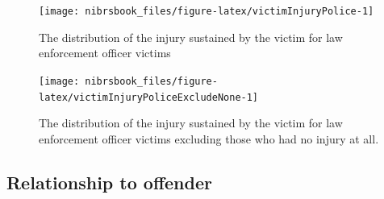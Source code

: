 \documentclass[
  12pt,
  openany]{book}
\begin{document}
\begin{figure}

{\centering \texttt{[image: nibrsbook\_files/figure-latex/victimInjuryPolice-1]} 

}

\caption{The distribution of the injury sustained by the victim for law enforcement officer victims}\label{fig:victimInjuryPolice}
\end{figure}

\begin{figure}

{\centering \texttt{[image: nibrsbook\_files/figure-latex/victimInjuryPoliceExcludeNone-1]} 

}

\caption{The distribution of the injury sustained by the victim for law enforcement officer victims excluding those who had no injury at all.}\label{fig:victimInjuryPoliceExcludeNone}
\end{figure}

\hypertarget{relationship-to-offender}{%
\subsection{Relationship to offender}\label{relationship-to-offender}}
\end{document}

